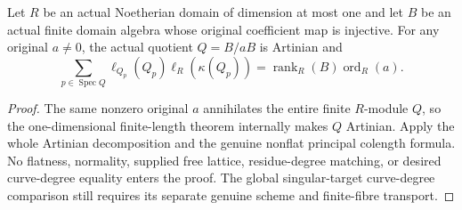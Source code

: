 \begin{theorem}
\label{thm:fc-nonflat-principal-local-degrees}
\leanok
{}
Let $R$ be an actual Noetherian domain of dimension at most one and let
$B$ be an actual finite domain algebra whose original coefficient map is
injective.  For any original $a\ne0$, the actual quotient $Q=B/aB$ is
Artinian and
\[
 \sum_{p\in\operatorname{Spec}Q}
 \ell_{Q_p}(Q_p)\ell_R(\kappa(Q_p))
 =\operatorname{rank}_R(B)\operatorname{ord}_R(a).
\]
\end{theorem}
\begin{proof}
The same nonzero original $a$ annihilates the entire finite $R$-module $Q$,
so the one-dimensional finite-length theorem internally makes $Q$
Artinian.  Apply the whole Artinian decomposition and the genuine nonflat
principal colength formula.  No flatness, normality, supplied free lattice,
residue-degree matching, or desired curve-degree equality enters the proof.
The global singular-target curve-degree comparison still requires its
separate genuine scheme and finite-fibre transport.
\end{proof}
